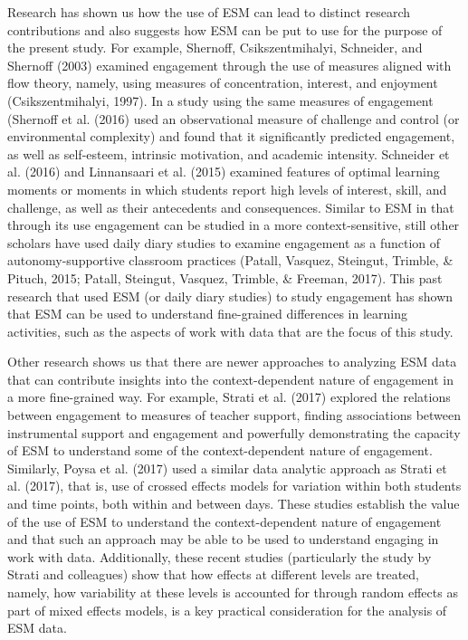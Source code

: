 \documentclass[]{book}
\theoremstyle{definition}
\theoremstyle{definition}
\theoremstyle{definition}
\theoremstyle{remark}
\begin{document}
Research has shown us how the use of ESM can lead to distinct research
contributions and also suggests how ESM can be put to use for the
purpose of the present study. For example, Shernoff, Csikszentmihalyi,
Schneider, and Shernoff (2003) examined engagement through the use of
measures aligned with flow theory, namely, using measures of
concentration, interest, and enjoyment (Csikszentmihalyi, 1997). In a
study using the same measures of engagement (Shernoff et al. (2016) used
an observational measure of challenge and control (or environmental
complexity) and found that it significantly predicted engagement, as
well as self-esteem, intrinsic motivation, and academic intensity.
Schneider et al. (2016) and Linnansaari et al. (2015) examined features
of optimal learning moments or moments in which students report high
levels of interest, skill, and challenge, as well as their antecedents
and consequences. Similar to ESM in that through its use engagement can
be studied in a more context-sensitive, still other scholars have used
daily diary studies to examine engagement as a function of
autonomy-supportive classroom practices (Patall, Vasquez, Steingut,
Trimble, \& Pituch, 2015; Patall, Steingut, Vasquez, Trimble, \&
Freeman, 2017). This past research that used ESM (or daily diary
studies) to study engagement has shown that ESM can be used to
understand fine-grained differences in learning activities, such as the
aspects of work with data that are the focus of this study.

Other research shows us that there are newer approaches to analyzing ESM
data that can contribute insights into the context-dependent nature of
engagement in a more fine-grained way. For example, Strati et al. (2017)
explored the relations between engagement to measures of teacher
support, finding associations between instrumental support and
engagement and powerfully demonstrating the capacity of ESM to
understand some of the context-dependent nature of engagement.
Similarly, Poysa et al. (2017) used a similar data analytic approach as
Strati et al. (2017), that is, use of crossed effects models for
variation within both students and time points, both within and between
days. These studies establish the value of the use of ESM to understand
the context-dependent nature of engagement and that such an approach may
be able to be used to understand engaging in work with data.
Additionally, these recent studies (particularly the study by Strati and
colleagues) show that how effects at different levels are treated,
namely, how variability at these levels is accounted for through random
effects as part of mixed effects models, is a key practical
consideration for the analysis of ESM data.
\end{document}
